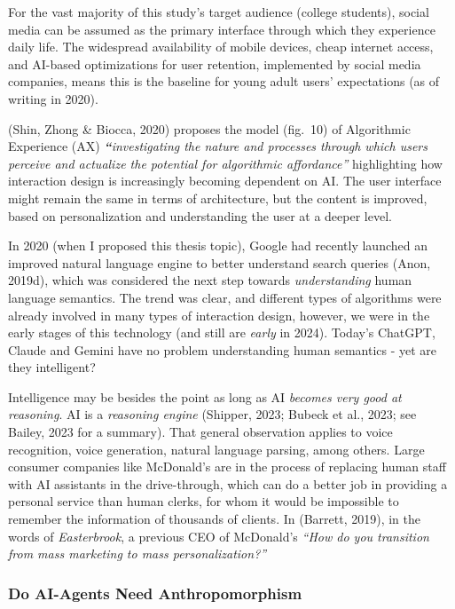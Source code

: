 \documentclass[
  letterpaper,
  DIV=11,
  numbers=noendperiod]{scrartcl}
\begin{document}
For the vast majority of this study's target audience (college
students), social media can be assumed as the primary interface through
which they experience daily life. The widespread availability of mobile
devices, cheap internet access, and AI-based optimizations for user
retention, implemented by social media companies, means this is the
baseline for young adult users' expectations (as of writing in 2020).

(Shin, Zhong \& Biocca, 2020) proposes the model (fig.~10) of
Algorithmic Experience (AX) \emph{\textbf{``}investigating the nature
and processes through which users perceive and actualize the potential
for algorithmic affordance''} highlighting how interaction design is
increasingly becoming dependent on AI. The user interface might remain
the same in terms of architecture, but the content is improved, based on
personalization and understanding the user at a deeper level.

In 2020 (when I proposed this thesis topic), Google had recently
launched an improved natural language engine to better understand search
queries (Anon, 2019d), which was considered the next step towards
\emph{understanding} human language semantics. The trend was clear, and
different types of algorithms were already involved in many types of
interaction design, however, we were in the early stages of this
technology (and still are \emph{early} in 2024). Today's ChatGPT, Claude
and Gemini have no problem understanding human semantics - yet are they
intelligent?

Intelligence may be besides the point as long as AI \emph{becomes very
good at reasoning}. AI is a \emph{reasoning engine} (Shipper, 2023;
Bubeck et al., 2023; see Bailey, 2023 for a summary). That general
observation applies to voice recognition, voice generation, natural
language parsing, among others. Large consumer companies like McDonald's
are in the process of replacing human staff with AI assistants in the
drive-through, which can do a better job in providing a personal service
than human clerks, for whom it would be impossible to remember the
information of thousands of clients. In (Barrett, 2019), in the words of
\emph{Easterbrook}, a previous CEO of McDonald's \emph{``How do you
transition from mass marketing to mass personalization?''}

\subsubsection{Do AI-Agents Need
Anthropomorphism}\label{do-ai-agents-need-anthropomorphism}
\end{document}
